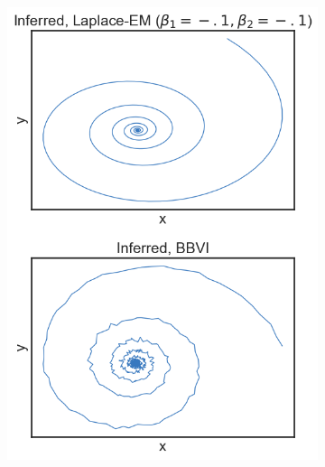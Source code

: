 \begin{figure}
    \begin{subfigure}[b]{0.33\linewidth}
        \centering
        \includegraphics[width=\linewidth]{./Figures/bautin-stable.png}
        \caption{}
        \label{bautinresults:a}
        \vspace{4ex}
    \end{subfigure}%
    \begin{subfigure}[b]{0.33\linewidth}
        \centering

\end{subfigure}
\end{figure}
